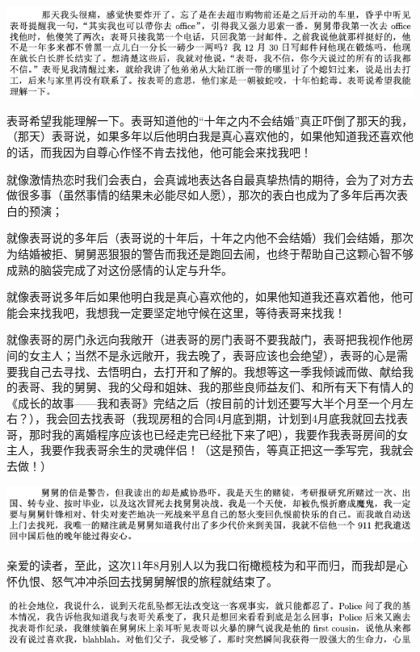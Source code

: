 \documentclass[9pt, b5paper]{article}
\begin{document}
\begin{center}
\includegraphics[width=.9\linewidth]{./pic/p1p50-4.png}
\end{center}

表哥希望我能理解一下。表哥知道他的“十年之内不会结婚”真正吓倒了那天的我，（那天）表哥说，如果多年以后他明白我是真心喜欢他的，如果他知道我还喜欢他的话，而我因为自尊心作怪不肯去找他，他可能会来找我吧！

就像激情热恋时我们会表白，会真诚地表达各自最真挚热情的期待，会为了对方去做很多事（虽然事情的结果未必能尽如人愿），那次的表白也成为了多年后再次表白的预演；

就像表哥说的多年后（表哥说的十年后，十年之内他不会结婚）我们会结婚，那次为结婚被拒、舅舅恶狠狠的警告而我还是跑回去闹，也终于帮助自己这颗心智不够成熟的脑袋完成了对这份感情的认定与升华。

就像表哥说多年后如果他明白我是真心喜欢他的，如果他知道我还喜欢着他，他可能会来找我吧，我想我一定要坚定地守候在这里，等待表哥来找我！

就像表哥的房门永远向我敞开（进表哥的房门表哥不要我敲门，表哥把我视作他房间的女主人；当然不是永远敞开，我去晚了，表哥应该也会绝望），表哥的心是需要我自己去寻找、去悟明白，去打开和了解的。我想等这一季我倾诚而做、献给我的表哥、我的舅舅、我的父母和姐妹、我的那些良师益友们、和所有天下有情人的《成长的故事——我和表哥》完结之后（按目前的计划还要写大半个月至一个月左右？），我会回去找表哥（我现房租的合同4月底到期，计划到4月底我就回去找表哥，那时我的离婚程序应该也已经走完已经批下来了吧），我要作我表哥房间的女主人，我要作我表哥余生的灵魂伴侣！（这是预告，等真正把这一季写完，我就会去做！）

\begin{center}
\includegraphics[width=.9\linewidth]{./pic/p1p67-2.png}
\end{center}

亲爱的读者，至此，这次11年8月别人以为我口衔橄榄枝为和平而归，而我却是心怀仇恨、怒气冲冲杀回去找舅舅解恨的旅程就结束了。

\begin{center}
\includegraphics[width=.9\linewidth]{./pic/p1p68-4.png}
\end{center}
\end{document}
